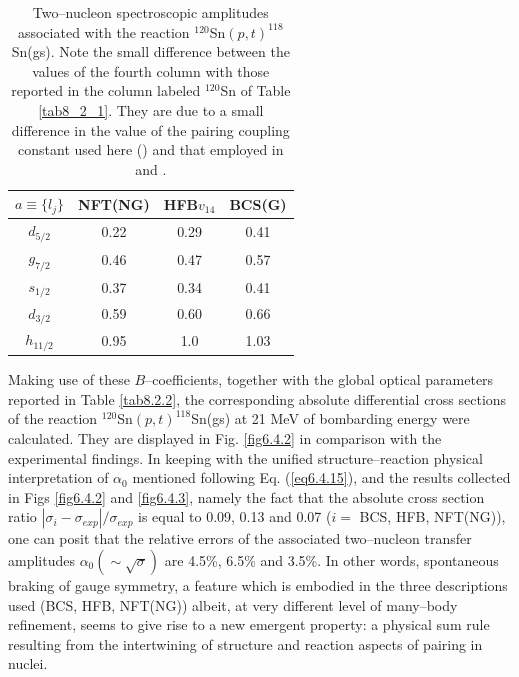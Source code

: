 \begin{table}
\begin{center}
\begin{tabular}{|c|c|c|c|}
\hline
$a\equiv\{l_j\}$ & NFT(NG)  & HFB$v_{14}$  & BCS(G)  \\ 
 \hline 
$d_{5/2}$ & 0.22 & 0.29 & 0.41 \\ 
\hline 
$g_{7/2}$ & 0.46 & 0.47 &  0.57\\ 
 \hline
$s_{1/2}$ & 0.37 & 0.34 & 0.41 \\ 
 \hline
$d_{3/2}$ & 0.59 & 0.60 & 0.66 \\ 
 \hline
$h_{11/2}$ & 0.95 & 1.0 & 1.03\\
 \hline
\end{tabular}
\end{center}
\caption{Two--nucleon spectroscopic amplitudes associated with the reaction $^{120}$Sn$(p,t)^{118}$Sn(gs). Note the small difference between the values of the fourth column with those reported in the column labeled $^{120}$Sn of Table \ref{tab8_2_1}. They are due to a small difference in the value of the pairing coupling constant used here  (\cite{Potel:17}) and that employed in \cite{Potel:17} and \cite{Potel:13b}.}\label{tab6.4.3}
\end{table} 

Making use of these $B$--coefficients, together with the global optical parameters reported in Table \ref{tab8.2.2}, the corresponding absolute differential cross sections of the reaction $^{120}$Sn$(p,t)^{118}$Sn(gs) at 21 MeV of bombarding energy were calculated. They are displayed in Fig. \ref{fig6.4.2} in comparison with the experimental findings. In keeping with the unified structure--reaction physical interpretation of $\alpha_0$ mentioned following Eq. (\ref{eq6.4.15}), and 
the results collected in Figs \ref{fig6.4.2} and \ref{fig6.4.3}, namely the fact that the absolute cross section ratio $|\sigma_i-\sigma_{exp}|/\sigma_{exp}$ is equal to 0.09, 0.13 and 0.07 ($i=$ BCS, HFB, NFT(NG)), one can posit that the relative errors of the associated two--nucleon transfer amplitudes $\alpha_0(\sim\sqrt{\sigma})$ are 4.5\%, 6.5\% and 3.5\%. In other words, spontaneous braking of gauge symmetry, a feature which is embodied in the three descriptions used (BCS, HFB, NFT(NG)) albeit, at very different level of many--body refinement, seems to give rise to a new emergent property: a physical sum rule resulting from the intertwining of structure and reaction aspects of pairing in nuclei. 

